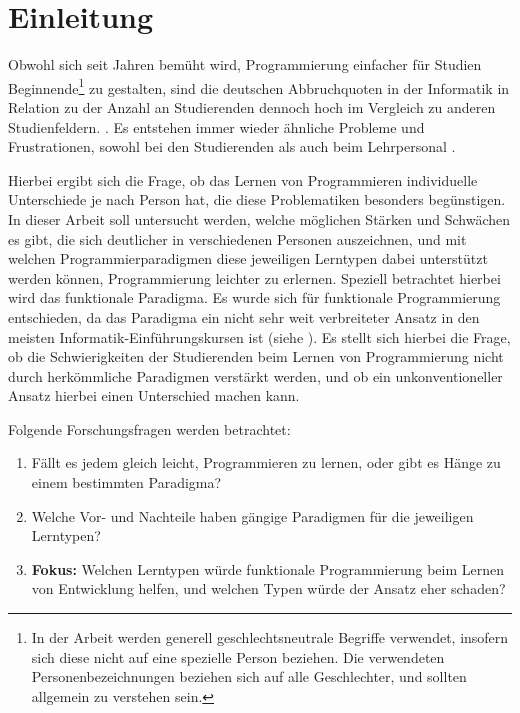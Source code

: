 \clearpage
\section{Einleitung}
\label{sec:intro}

Obwohl sich seit Jahren bemüht wird, Programmierung einfacher für Studien Beginnende\footnote{In der Arbeit werden generell geschlechtsneutrale Begriffe verwendet, insofern sich diese nicht auf eine spezielle Person beziehen. Die verwendeten Personenbezeichnungen beziehen sich auf alle Geschlechter, und sollten allgemein zu verstehen sein.} zu gestalten, sind die deutschen Abbruchquoten in der Informatik in Relation zu der Anzahl an Studierenden \cite{destatis} dennoch hoch im Vergleich zu anderen Studienfeldern. \cite{dhzw}.
Es entstehen immer wieder ähnliche Probleme und Frustrationen, sowohl bei den Studierenden als auch beim Lehrpersonal \cite{mcdonald}.

Hierbei ergibt sich die Frage, ob das Lernen von Programmieren individuelle Unterschiede je nach Person hat, die diese Problematiken besonders begünstigen. In dieser Arbeit soll untersucht werden, welche möglichen Stärken und Schwächen es gibt, die sich deutlicher in verschiedenen Personen auszeichnen, und mit welchen Programmierparadigmen diese jeweiligen Lerntypen dabei unterstützt werden können, Programmierung leichter zu erlernen.
Speziell betrachtet hierbei wird das funktionale Paradigma. Es wurde sich für funktionale Programmierung entschieden, da das Paradigma ein nicht sehr weit verbreiteter Ansatz in den meisten Informatik-Einführungskursen ist (siehe ). Es stellt sich hierbei die Frage, ob die Schwierigkeiten der Studierenden beim Lernen von Programmierung nicht durch herkömmliche Paradigmen verstärkt werden, und ob ein unkonventioneller Ansatz hierbei einen Unterschied machen kann.

Folgende Forschungsfragen werden betrachtet:

\begin{enumerate}
    \item Fällt es jedem gleich leicht, Programmieren zu lernen, oder gibt es Hänge zu einem bestimmten Paradigma?
    \item Welche Vor- und Nachteile haben gängige Paradigmen für die jeweiligen Lerntypen?
    \item \textbf{Fokus:} Welchen Lerntypen würde funktionale Programmierung beim Lernen von Entwicklung helfen, und welchen Typen würde der Ansatz eher schaden?
\end{enumerate}
